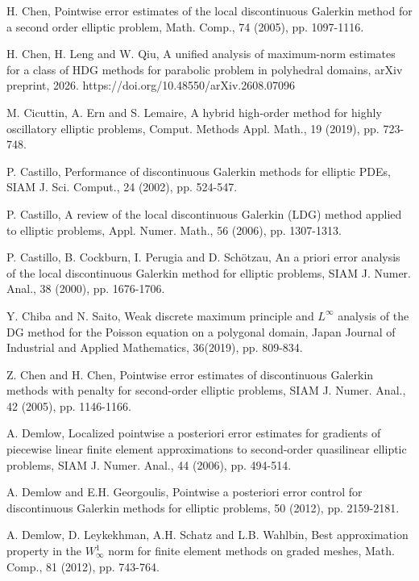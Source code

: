 \documentclass[1996/10/24]{amsart}
\theoremstyle{definition}
\numberwithin{equation}{section}
\begin{document}
\begin{thebibliography}{}
H. Chen, Pointwise error estimates of the local discontinuous Galerkin method for a second order elliptic problem, Math. Comp., 74 (2005), pp. 1097-1116.

H. Chen, H. Leng and W. Qiu, A unified analysis of maximum-norm estimates for a class of HDG methods for parabolic problem in polyhedral domains, arXiv preprint, 2026. https://doi.org/10.48550/arXiv.2608.07096

M. Cicuttin, A. Ern and S. Lemaire, A hybrid high-order method for highly oscillatory elliptic problems, Comput. Methods Appl. Math., 19 (2019), pp. 723-748.

P. Castillo, Performance of discontinuous Galerkin methods for elliptic PDEs, SIAM J. Sci. Comput., 24 (2002), pp. 524-547.

P. Castillo, A review of the local discontinuous Galerkin (LDG) method applied to elliptic problems, Appl. Numer. Math., 56 (2006), pp. 1307-1313.

P. Castillo, B. Cockburn, I. Perugia and D. Sch\"{o}tzau, An a priori error analysis of the local discontinuous Galerkin method for elliptic problems, SIAM
J. Numer. Anal., 38 (2000), pp. 1676-1706.

Y. Chiba and N. Saito, Weak discrete maximum principle and $L^{\infty}$ analysis of the DG method for the Poisson equation on a polygonal domain,
Japan Journal of Industrial and Applied Mathematics, 36(2019), pp. 809-834.

Z. Chen and H. Chen, Pointwise error estimates of discontinuous Galerkin methods with penalty for second-order elliptic problems, SIAM J. Numer. Anal.,
42 (2005), pp. 1146-1166.

A. Demlow, Localized pointwise a posteriori error estimates for gradients of piecewise linear finite element approximations to second-order quasilinear elliptic problems, SIAM J. Numer. Anal., 44 (2006), pp. 494-514.

A. Demlow and E.H. Georgoulis, Pointwise a posteriori error control for discontinuous Galerkin methods for elliptic problems, 50 (2012), pp. 2159-2181.

A. Demlow, D. Leykekhman, A.H. Schatz and L.B. Wahlbin, Best approximation property in the $W^1_{\infty}$ norm for finite element methods on graded meshes,
Math. Comp., 81 (2012), pp. 743-764.


\end{thebibliography}
\end{document}
